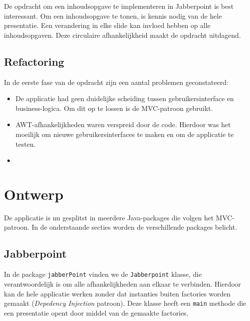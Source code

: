 \documentclass[a4paper]{article}
\newcommand{\code}[1]{\lstinline[columns=fixed]{#1}}
\begin{document}
    De opdracht om een inhoudsopgave te implementeren in Jabberpoint is best interessant.
    Om een inhoudsopgave te tonen, is kennis nodig van de hele presentatie.
    Een verandering in elke slide kan invloed hebben op alle inhoudsopgaven.
    Deze circulaire afhankelijkheid maakt de opdracht uitdagend.

	\subsection{Refactoring}
	In de eerste fase van de opdracht zijn een aantal problemen geconstateerd:
	\begin{itemize}
		\item De applicatie had geen duidelijke scheiding tussen gebruikersinterface en business-logica.
			Om dit op te lossen is de MVC-patroon gebruikt.
		\item AWT-afhankelijkheden waren verspreid door de code.
			Hierdoor was het moeilijk om nieuwe gebruikersinterfaces te maken en om de applicatie te testen.
		\item \TODO{}
	\end{itemize}

\section{Ontwerp}
    \label{sec:ontwerp}
	De applicatie is nu gesplitst in meerdere Java-packages die volgen het MVC-patroon.
	In de onderstaande secties worden de verschillende packages belicht.

	\subsection{Jabberpoint}
	In de package \code{jabberPoint} vinden we de \code{Jabberpoint} klasse, die verantwoordelijk is om alle afhankelijkheden aan elkaar te verbinden.
	Hierdoor kan de hele applicatie werken zonder dat instanties buiten factories worden gemaakt (\textit{Depedency Injection} patroon).
	Deze klasse heeft een \code{main} methode die een presentatie opent door middel van de gemaakte factories.
\end{document}
